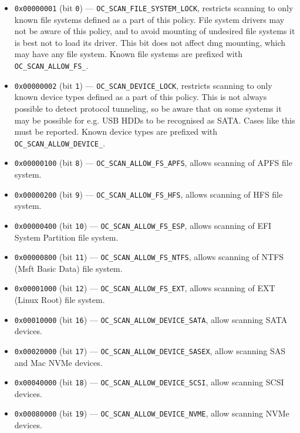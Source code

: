 \documentclass[]{article}
\providecommand{\tightlist}{%
  \setlength{\itemsep}{0pt}\setlength{\parskip}{0pt}}
\begin{document}
\begin{enumerate}
  \begin{itemize}
  \tightlist
    \item \texttt{0x00000001} (bit \texttt{0}) --- \texttt{OC\_SCAN\_FILE\_SYSTEM\_LOCK}, restricts
    scanning to only known file systems defined as a part of this policy. File system
    drivers may not be aware of this policy, and to avoid mounting of undesired file
    systems it is best not to load its driver. This bit does not affect dmg mounting,
    which may have any file system. Known file systems are prefixed with
    \texttt{OC\_SCAN\_ALLOW\_FS\_}.
    \item \texttt{0x00000002} (bit \texttt{1}) --- \texttt{OC\_SCAN\_DEVICE\_LOCK}, restricts scanning
    to only known device types defined as a part of this policy. This is not always possible
    to detect protocol tunneling, so be aware that on some systems it may be possible for
    e.g. USB HDDs to be recognised as SATA. Cases like this must be reported. Known device
    types are prefixed with \texttt{OC\_SCAN\_ALLOW\_DEVICE\_}.
    \item \texttt{0x00000100} (bit \texttt{8}) --- \texttt{OC\_SCAN\_ALLOW\_FS\_APFS}, allows scanning
    of APFS file system.
    \item \texttt{0x00000200} (bit \texttt{9}) --- \texttt{OC\_SCAN\_ALLOW\_FS\_HFS}, allows scanning
    of HFS file system.
    \item \texttt{0x00000400} (bit \texttt{10}) --- \texttt{OC\_SCAN\_ALLOW\_FS\_ESP}, allows scanning
    of EFI System Partition file system.
    \item \texttt{0x00000800} (bit \texttt{11}) --- \texttt{OC\_SCAN\_ALLOW\_FS\_NTFS}, allows scanning
    of NTFS (Msft Basic Data) file system.
    \item \texttt{0x00001000} (bit \texttt{12}) --- \texttt{OC\_SCAN\_ALLOW\_FS\_EXT}, allows scanning
    of EXT (Linux Root) file system.
    \item \texttt{0x00010000} (bit \texttt{16}) --- \texttt{OC\_SCAN\_ALLOW\_DEVICE\_SATA}, allow
    scanning SATA devices.
    \item \texttt{0x00020000} (bit \texttt{17}) --- \texttt{OC\_SCAN\_ALLOW\_DEVICE\_SASEX}, allow
    scanning SAS and Mac NVMe devices.
    \item \texttt{0x00040000} (bit \texttt{18}) --- \texttt{OC\_SCAN\_ALLOW\_DEVICE\_SCSI}, allow
    scanning SCSI devices.
    \item \texttt{0x00080000} (bit \texttt{19}) --- \texttt{OC\_SCAN\_ALLOW\_DEVICE\_NVME}, allow
    scanning NVMe devices.

\end{itemize}
\end{enumerate}
\end{document}
